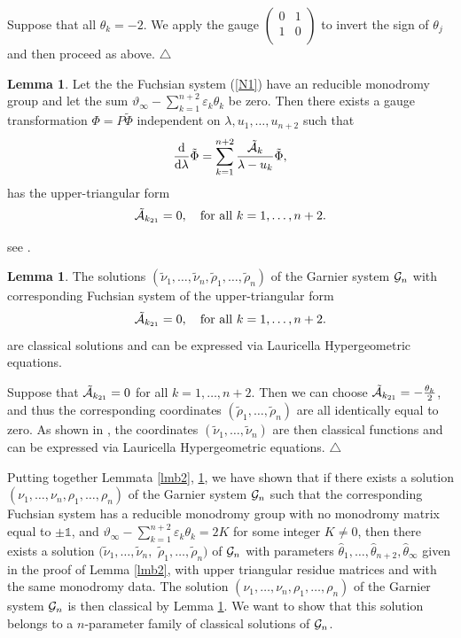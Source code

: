 \documentclass[12pt]{article}
\def\thi{{\vartheta_\infty}}
\def\eps{\varepsilon}
\newcommand{\ID}{\mathbb{1}}
\theoremstyle{definition}
\theoremstyle{theorem}
\newtheorem{lm}[df]{Lemma}
\begin{document}
Suppose that all $\theta_k=-2$. We
apply the gauge $\left(\begin{array}{cc}0&1\\ 1&0\\
\end{array}\right)$ to invert the sign of $\theta_j$ and then 
proceed as above. {\hfill$\bigtriangleup$}

\begin{lm}
Let the the Fuchsian system (\ref{N1}) have an reducible monodromy
group and let the sum $\thi-\sum_{k=1}^{n+2}\eps_k\theta_k$ be zero. 
Then there exists a gauge transformation $\Phi=P\tilde\Phi$ 
independent on $\lambda,u_1,\dots,u_{n+2}$ such that
$$
{{\rm d}\over{\rm d}\lambda}\tilde\Phi=
\sum_{k=1}^{n+2}{\tilde{\cal A}_k\over \lambda-u_k}\tilde\Phi,
$$
has the upper-triangular form
$$
\tilde{\cal A}_{k_{21}}=0,\quad\hbox{for all }
k=1,\dots,n+2.
$$
\label{lmb3}\end{lm}
 see \cite{AB}.

\begin{lm}
The solutions 
$(\tilde\nu_1,\dots,\tilde\nu_n,\tilde\rho_1,\dots,\tilde\rho_n)$
of the Garnier system ${\cal G}_{n}$ with corresponding Fuchsian
system of the upper-triangular form
$$
\tilde{\cal A}_{k_{21}}=0,\quad\hbox{for all }
k=1,\dots,n+2.
$$
are classical solutions and can be expressed via Lauricella Hypergeometric 
equations.
\label{lmlauricella}\end{lm}

 Suppose that $\tilde{\cal A}_{k_{21}}=0$ for all 
$k=1,\dots,n+2$. Then we can choose 
$\tilde{\cal A}_{k_{21}}=-{\theta_k\over2}$, and thus the
corresponding coordinates $(\tilde\rho_1,\dots,\tilde\rho_n)$
are all identically equal to zero. As shown in \cite{OK}, the 
coordinates $(\tilde\nu_1,\dots,\tilde\nu_n)$ are then classical 
functions and can be expressed via Lauricella Hypergeometric 
equations. {\hfill$\bigtriangleup$}

Putting together Lemmata \ref{lmb2}, \ref{lmb3}, we have shown that if there 
exists a solution $(\nu_1,\dots,\nu_n,\rho_1,\dots,\rho_n)$ of the 
Garnier system ${\cal G}_{n}$ such that the corresponding Fuchsian 
system has a reducible monodromy group with no monodromy matrix equal 
to $\pm\ID$, and $\thi-\sum_{k=1}^{n+2}\eps_k\theta_k=2 K$ for some 
integer $K\neq0$, then there exists a solution
$(\tilde\nu_1,\dots,\tilde\nu_n,$ $\tilde\rho_1,\dots,\tilde\rho_n)$
of ${\cal G}_{n}$ with parameters 
$\hat\theta_1,\dots,\hat\theta_{n+2},\hat{\theta}_\infty$ given in the proof
of Lemma \ref{lmb2},
with upper triangular residue matrices and with the same monodromy
data. The solution $(\nu_1,\dots,\nu_n,\rho_1,\dots,\rho_n)$ of 
the Garnier system ${\cal G}_{n}$ is then classical by Lemma 
\ref{lmlauricella}. We want to show that this solution belongs
to a $n$-parameter family of classical solutions of ${\cal G}_{n}$.
\end{document}
